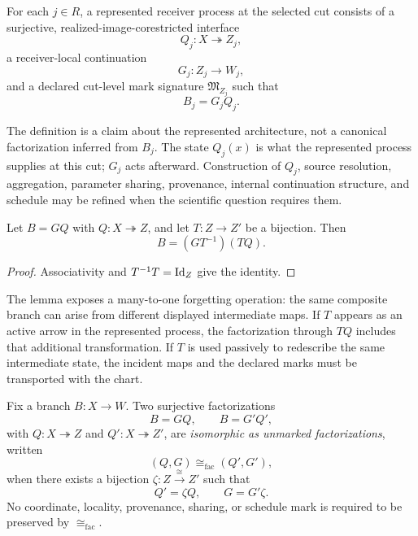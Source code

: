 \begin{definition}\label{def:receiver-factorization-v13}
For each $j\in R$, a represented receiver process at the selected cut consists of a surjective, realized-image-corestricted interface
\[
Q_j:X\twoheadrightarrow Z_j,
\]
a receiver-local continuation
\[
G_j:Z_j\to W_j,
\]
and a declared cut-level mark signature $\mathfrak M_{Z_j}$ such that
\[
\boxed{B_j=G_jQ_j.}
\]
\end{definition}

The definition is a claim about the represented architecture, not a canonical factorization inferred from $B_j$. The state $Q_j(x)$ is what the represented process supplies at this cut; $G_j$ acts afterward. Construction of $Q_j$, source resolution, aggregation, parameter sharing, provenance, internal continuation structure, and schedule may be refined when the scientific question requires them.

\begin{lemma}\label{lem:factorization-contraction-v13}
Let $B=GQ$ with $Q:X\twoheadrightarrow Z$, and let $T:Z\to Z'$ be a bijection. Then
\[
\boxed{B=(GT^{-1})(TQ).}
\]
\end{lemma}

\begin{proof}
Associativity and $T^{-1}T=\operatorname{Id}_Z$ give the identity.
\end{proof}

The lemma exposes a many-to-one forgetting operation: the same composite branch can arise from different displayed intermediate maps. If $T$ appears as an active arrow in the represented process, the factorization through $TQ$ includes that additional transformation. If $T$ is used passively to redescribe the same intermediate state, the incident maps and the declared marks must be transported with the chart.

\begin{definition}\label{def:factorization-isomorphism-v14}
Fix a branch $B:X\to W$. Two surjective factorizations
\[
B=GQ,
\qquad
B=G'Q',
\]
with $Q:X\twoheadrightarrow Z$ and $Q':X\twoheadrightarrow Z'$, are \emph{isomorphic as unmarked factorizations}, written
\[
(Q,G)\cong_{\mathrm{fac}}(Q',G'),
\]
when there exists a bijection $\zeta:Z\xrightarrow{\cong}Z'$ such that
\[
\boxed{Q'=\zeta Q,
\qquad
G=G'\zeta.}
\]
No coordinate, locality, provenance, sharing, or schedule mark is required to be preserved by $\cong_{\mathrm{fac}}$.
\end{definition}

